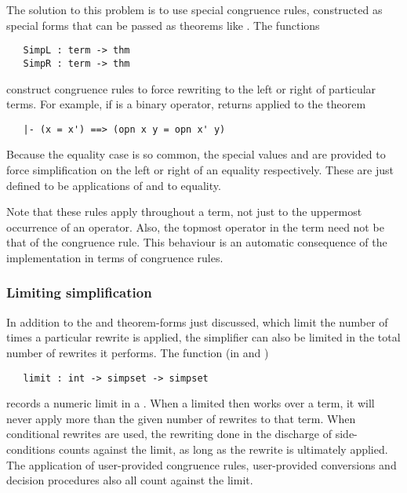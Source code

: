 The solution to this problem is to use special congruence rules,
constructed as special forms that can be passed as theorems like
.  The functions
\begin{hol}
\begin{verbatim}
   SimpL : term -> thm
   SimpR : term -> thm
\end{verbatim}
\end{hol}
construct congruence rules to force rewriting to the left or right of
particular terms.  For example, if  is a binary operator,
 returns  applied to the theorem
\begin{hol}
\begin{verbatim}
   |- (x = x') ==> (opn x y = opn x' y)
\end{verbatim}
\end{hol}
Because the equality case is so common, the special values
 and  are provided to force
simplification on the left or right of an equality respectively.
These are just defined to be applications of  and 
to equality.

Note that these rules apply throughout a term, not just to the
uppermost occurrence of an operator.  Also, the topmost operator in
the term need not be that of the congruence rule.  This behaviour is
an automatic consequence of the implementation in terms of congruence
rules.

\subsubsection{Limiting simplification}
\label{sec:limit-simpl}

In addition to the  and  theorem-forms just
discussed, which limit the number of times a particular rewrite is
applied, the simplifier can also be limited in the total number of
rewrites it performs. The  function (in  and
)
\begin{hol}
\begin{verbatim}
   limit : int -> simpset -> simpset
\end{verbatim}
\end{hol}
records a numeric limit in a \simpset{}.  When a limited \simpset{}
then works over a term, it will never apply more than the given number
of rewrites to that term.  When conditional rewrites are used, the
rewriting done in the discharge of side-conditions counts against the
limit, as long as the rewrite is ultimately applied.  The application
of user-provided congruence rules, user-provided conversions and
decision procedures also all count against the limit.

